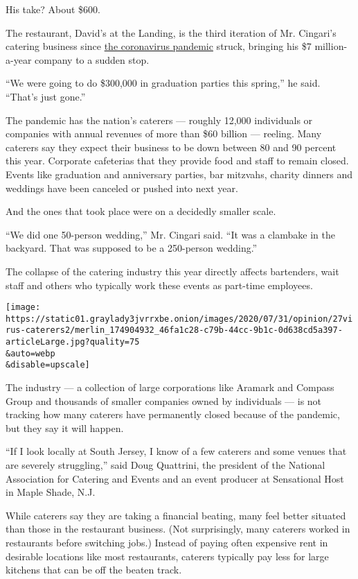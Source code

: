 His take? About \$600.

The restaurant, David's at the Landing, is the third iteration of Mr.
Cingari's catering business since
\href{https://www.nytimes3xbfgragh.onion/news-event/coronavirus}{the
coronavirus pandemic} struck, bringing his \$7 million-a-year company to
a sudden stop.

``We were going to do \$300,000 in graduation parties this spring,'' he
said. ``That's just gone.''

The pandemic has the nation's caterers --- roughly 12,000 individuals or
companies with annual revenues of more than \$60 billion --- reeling.
Many caterers say they expect their business to be down between 80 and
90 percent this year. Corporate cafeterias that they provide food and
staff to remain closed. Events like graduation and anniversary parties,
bar mitzvahs, charity dinners and weddings have been canceled or pushed
into next year.

And the ones that took place were on a decidedly smaller scale.

``We did one 50-person wedding,'' Mr. Cingari said. ``It was a clambake
in the backyard. That was supposed to be a 250-person wedding.''

The collapse of the catering industry this year directly affects
bartenders, wait staff and others who typically work these events as
part-time employees.

\texttt{[image: https://static01.graylady3jvrrxbe.onion/images/2020/07/31/opinion/27virus-caterers2/merlin\_174904932\_46fa1c28-c79b-44cc-9b1c-0d638cd5a397-articleLarge.jpg?quality=75\\\&auto=webp\\\&disable=upscale]}

The industry --- a collection of large corporations like Aramark and
Compass Group and thousands of smaller companies owned by individuals
--- is not tracking how many caterers have permanently closed because of
the pandemic, but they say it will happen.

``If I look locally at South Jersey, I know of a few caterers and some
venues that are severely struggling,'' said Doug Quattrini, the
president of the National Association for Catering and Events and an
event producer at Sensational Host in Maple Shade, N.J.

While caterers say they are taking a financial beating, many feel better
situated than those in the restaurant business. (Not surprisingly, many
caterers worked in restaurants before switching jobs.) Instead of paying
often expensive rent in desirable locations like most restaurants,
caterers typically pay less for large kitchens that can be off the
beaten track.

